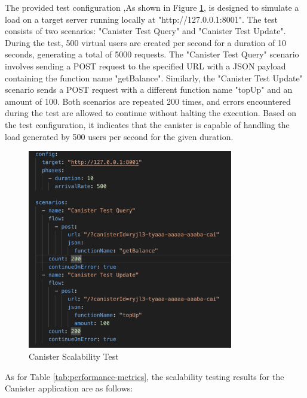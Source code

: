 The provided test configuration ,As shown in Figure \ref{fig:Canister Scalability Test}, is designed to simulate a load on a target server running locally at "http://127.0.0.1:8001". The test consists of two scenarios: "Canister Test Query" and "Canister Test Update". During the test, 500 virtual users are created per second for a duration of 10 seconds, generating a total of 5000 requests. The "Canister Test Query" scenario involves sending a POST request to the specified URL with a JSON payload containing the function name "getBalance". Similarly, the "Canister Test Update" scenario sends a POST request with a different function name "topUp" and an amount of 100. Both scenarios are repeated 200 times, and errors encountered during the test are allowed to continue without halting the execution. Based on the test configuration, it indicates that the canister is capable of handling the load generated by 500 users per second for the given duration.

\begin{figure}[ht]
    \centering
    \includegraphics[width=0.8\textwidth]{Scalability.png}
    \caption{Canister Scalability Test}
    \label{fig:Canister Scalability Test}
\end{figure}

As for Table \ref{tab:performance-metrics}, the scalability testing results for the Canister application are as follows:

